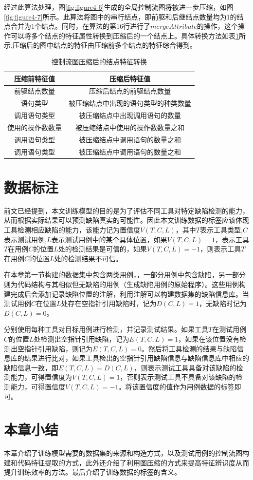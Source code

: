 经过此算法处理，图\ref{fig:figure4-6}生成的全局控制流图将被进一步压缩，如图\ref{fig:figure4-7}所示。此算法将图中的串行结点，即前驱和后继结点数量均为1的结点合并为1个结点。同时，在算法的第16行进行了$mergeAttribute$的操作，这个操作可以将多个结点的特征属性转换到压缩后的一个结点上。具体转换方法如表\ref{tab:table4-6}所示,压缩后的图中结点的特征由压缩前多个结点的特征综合得到。

\begin{table}
	\centering
	\caption{控制流图压缩后的结点特征转换} \label{tab:table4-6}
	\begin{tabular*}{0.9\textwidth}{@{\extracolsep{\fill}}cc}
		\toprule
		压缩前特征值	&压缩后特征值	 \\
		\midrule
		前驱结点数量 & 压缩后结点的前驱结点数量	\\
		语句类型 & 被压缩结点中出现的语句类型的种类数量	 \\
		调用语句类型 & 被压缩结点中出现调用语句的数量 \\
		使用的操作数数量 & 被压缩结点中使用的操作数数量之和 \\
		调用语句类型 & 被压缩结点中调用语句的数量之和 \\
		调用语句类型 & 被压缩结点中调用语句的数量之和 \\
		\bottomrule
	\end{tabular*}
\end{table}

\section{数据标注}
前文已经提到，本文训练模型的目的是为了评估不同工具对特定缺陷检测的能力，从而根据实际结果可以预测缺陷真实的可能性。因此本文训练数据的标签应该体现工具检测相应缺陷的能力，该能力记为置信度$V(T,C,L)$，其中$T$表示工具类型,$C$表示测试用例,$L$表示测试用例中的某个具体位置，如果$V(T,C,L)=1$，表示工具$T$在用例$C$的位置$L$处的检测结果是可信的，如果$V(T,C,L)=-1$，则表示工具$T$在用例$C$的位置$L$处的检测结果不可信。

在本章第一节构建的数据集中包含两类用例，，一部分用例中包含缺陷，另一部分则为代码结构与其相似但无缺陷的用例（生成缺陷用例的原始程序）。这些用例构建完成后会添加记录缺陷位置的注解，利用注解可以构建数据集的缺陷信息库。当测试用例$C$在位置$L$处存在空指针引用缺陷时，记为$D(C,L)=1$，无缺陷时记为$D(C,L)=0$。

分别使用每种工具对目标用例进行检测，并记录测试结果。如果工具$T$在测试用例$C$的位置$L$处检测出空指针引用缺陷，记为$E(T,C,L)=1$，如果在该位置没有检测出空指针引用缺陷，则记为$E(T,C,L)=0$。然后将工具检测的结果与缺陷信息库的结果进行比对，如果工具检出的空指针引用缺陷信息与缺陷信息库中相应的缺陷信息一致，即$E(T,C,L)=D(C,L)$，则表示测试工具具备对该缺陷的检测能力，可得置信度为$V(T,C,L)=1$，否则表示测试工具不具备对该缺陷的检测能力，可得置信度$V(T,C,L)=-1$。将该置信度的值作为用例数据的标签即可。

\section{本章小结}

本章介绍了训练模型需要的数据集的来源和构造方式，以及测试用例的控制流图构建和代码特征提取的方式，此外还介绍了利用图压缩的方式来提高特征辨识度从而提升训练效率的方法。最后介绍了训练数据的标签的含义。